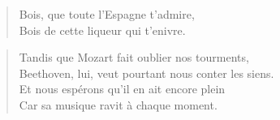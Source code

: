 \begin{verse}
  \distique%
  Bois, que toute l’Espagne t’admire,\\  %
  Bois de cette liqueur qui t’enivre.
\end{verse}

\begin{verse}
  \quatrain%
  Tandis que Mozart fait oublier nos tourments,\\  %
  Beethoven, lui, veut pourtant nous conter les siens.\\  %
  Et nous espérons qu’il en ait encore plein\\  %
  Car sa musique ravit à chaque moment.
\end{verse}


